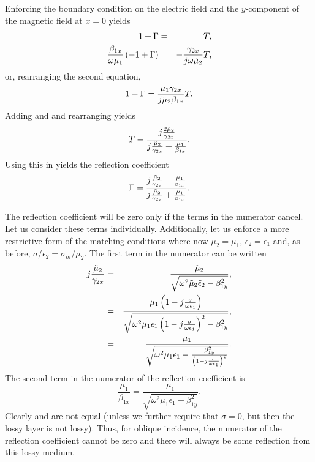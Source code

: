 Enforcing the boundary condition on the electric field and the
$y$-component of the magnetic field at $x=0$ yields
\begin{eqnarray}
  1 + \Gamma &=& T, \label{eq:eMatchingOblique} \\
  \frac{\beta_{1x}}{\omega\mu_1}\left(-1+\Gamma\right) &=&
  -\frac{\gamma_{2x}}{j\omega\tilde{\mu}_2} T,
\end{eqnarray}
or, rearranging the second equation, 
\begin{equation}
  1-\Gamma = \frac{\mu_1\gamma_{2x}}{j\tilde{\mu}_2 \beta_{1x}} T.
 \label{eq:hMatchingOblique} 
\end{equation}
Adding   and 
and rearranging  yields
\begin{equation}
  T = \frac{j\frac{2\tilde{\mu}_2}{\gamma_{2x}}}
           {j\frac{\tilde{\mu}_2}{\gamma_{2x}} + \frac{\mu_1}{\beta_{1x}}}.
\end{equation}
Using this in  yields the reflection
coefficient
\begin{equation}
  \Gamma = \frac{j\frac{\tilde{\mu}_2}{\gamma_{2x}} - \frac{\mu_1}{\beta_{1x}}}
                {j\frac{\tilde{\mu}_2}{\gamma_{2x}} + \frac{\mu_1}{\beta_{1x}}}.
\end{equation}

The reflection coefficient will be zero only if the terms in the
numerator cancel.  Let us consider these terms individually.
Additionally, let us enforce a more restrictive form of the matching
conditions where now $\mu_2=\mu_1$, $\epsilon_2=\epsilon_1$ and, as
before, $\sigma/\epsilon_2=\sigma_m/\mu_2$.  The first term in the
numerator can be written
\begin{eqnarray}
  j\frac{\tilde{\mu}_2}{\gamma_{2x}} &=& 
    \frac{\tilde{\mu}_2}{\sqrt{\omega^2\tilde{\mu}_2\tilde{\epsilon}_2-\beta_{1y}^2}}, \\
  &=&
   \frac{\mu_1\left(1-j\frac{\sigma}{\omega\epsilon_1}\right)}
   {\sqrt{\omega^2\mu_1\epsilon_1\left(1-j\frac{\sigma}{\omega\epsilon_1}\right)^2-\beta_{1y}^2}}, \\
  &=&
  \frac{\mu_1}
  {\sqrt{\omega^2\mu_1\epsilon_1-\frac{\beta_{1y}^2}
                                      {\left(1-j\frac{\sigma}{\omega\epsilon_1}\right)^2}}}.
  \label{eq:lossGammaNum1}
\end{eqnarray}
The second term in the numerator of the reflection coefficient is
\begin{equation}
  \frac{\mu_1}{\beta_{1x}} =   
  \frac{\mu_1}{\sqrt{\omega^2\mu_1\epsilon_1-\beta_{1y}^2}}.
  \label{eq:lossGammaNum2}
\end{equation}
Clearly  and  are not
equal (unless we further require that $\sigma=0$, but then the lossy
layer is not lossy).  Thus, for oblique incidence, the numerator of
the reflection coefficient cannot be zero and there will always be
some reflection from this lossy medium.

